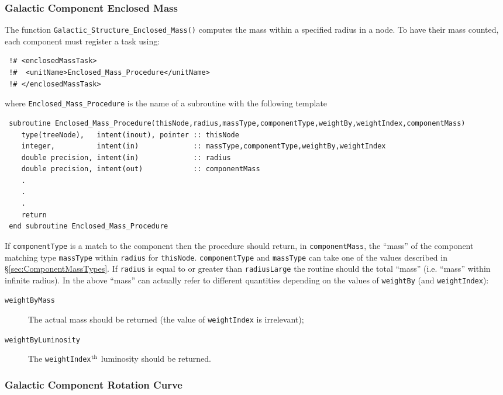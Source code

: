 \subsubsection{Galactic Component Enclosed Mass}

The function {\tt Galactic\_Structure\_Enclosed\_Mass()} computes the mass within a specified radius in a node. To have their mass counted, each component must register a task using:
\begin{verbatim}
 !# <enclosedMassTask>
 !#  <unitName>Enclosed_Mass_Procedure</unitName>
 !# </enclosedMassTask>
\end{verbatim}
where {\tt Enclosed\_Mass\_Procedure} is the name of a subroutine with the following template
\begin{verbatim}
 subroutine Enclosed_Mass_Procedure(thisNode,radius,massType,componentType,weightBy,weightIndex,componentMass)
    type(treeNode),   intent(inout), pointer :: thisNode
    integer,          intent(in)             :: massType,componentType,weightBy,weightIndex
    double precision, intent(in)             :: radius
    double precision, intent(out)            :: componentMass
    .
    .
    .
    return
 end subroutine Enclosed_Mass_Procedure
\end{verbatim}
If {\tt componentType} is a match to the component then the procedure should return, in {\tt componentMass}, the ``mass'' of the component matching type {\tt massType} within {\tt radius} for {\tt thisNode}.  {\tt componentType} and {\tt massType} can take one of the values described in \S\ref{sec:ComponentMassTypes}.
If {\tt radius} is equal to or greater than {\tt radiusLarge} the routine should the total ``mass'' (i.e. ``mass'' within infinite radius). In the above ``mass'' can actually refer to different quantities depending on the values of {\tt weightBy} (and {\tt weightIndex}):
\begin{description}
\item [{\tt weightByMass}] The actual mass should be returned (the value of {\tt weightIndex} is irrelevant);
\item [{\tt weightByLuminosity}] The {\tt weightIndex}$^{\rm th}$ luminosity should be returned.
\end{description}

\subsubsection{Galactic Component Rotation Curve}

